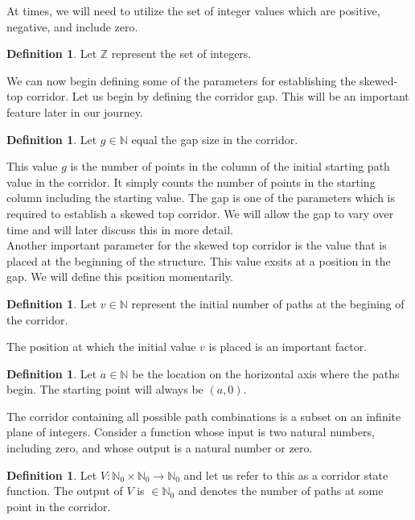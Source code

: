 \documentclass{article}
\newcommand*{\set}[1]{\mathbb{#1}}
\theoremstyle{definition}
\newtheorem{defn}[thm]{Definition}
\begin{document}
  \noindent At times, we will need to utilize the set of integer values which are positive, negative, and include zero. 
  \begin{defn} Let $\set{Z}$ represent the set of integers. \\ \end{defn}
  
  \noindent We can now begin defining some of the parameters for establishing the skewed-top corridor. Let us begin by defining 
  the corridor gap. This will be an important feature later in our journey. 
  \begin{defn} Let $g \in \set{N}$ equal the gap size in the corridor. \end{defn}
  \noindent This value $g$ is the number of points in the column of the initial starting path value in the corridor. It 
  simply counts the number of points in the starting column including the starting value. The gap is one of the parameters 
  which is required to establish a skewed top corridor. 
  We will allow the gap to vary over time and will later discuss this in more detail.\\
  
  \noindent Another important parameter for the skewed top corridor is the value that is placed at the 
  beginning of the structure. This value exsits at a position in the gap. We will define this position momentarily.
  \begin{defn} Let $v \in \set{N}$ represent the initial number of paths at the begining of the corridor.\\ \end{defn}
  
  \noindent The position at which the initial value $v$ is placed is an important factor. 
  \begin{defn} Let $a \in \set{N}$ be the location on the horizontal axis where the paths begin. The starting point 
  will always be $(a, 0)$.\\ \end{defn}

  \noindent The corridor containing all possible path combinations is a subset on an infinite plane of integers. Consider a function 
  whose input is two natural numbers, including zero, and whose output is a natural number or zero. 
  \begin{defn} Let $V \mathpunct{:} \set{N}_0 \times \set{N}_0 \rightarrow \set{N}_0$ and let us refer to this as a corridor state 
  function. The output of $V$ is $\in \set{N}_0$ and denotes the number of paths at some point in the corridor.\\ \end{defn}
  
\end{document}
